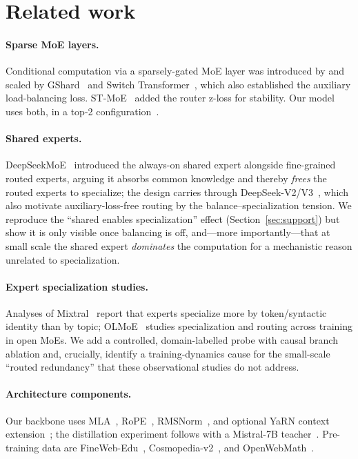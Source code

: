 \documentclass[11pt]{article}
\begin{document}
\section{Related work}

\paragraph{Sparse MoE layers.} Conditional computation via a sparsely-gated MoE layer was
introduced by \citet{shazeer2017outrageously} and scaled by GShard~\citep{lepikhin2021gshard} and
Switch Transformer~\citep{fedus2022switch}, which also established the auxiliary load-balancing
loss. ST-MoE~\citep{zoph2022stmoe} added the router z-loss for stability. Our model uses both, in a
top-2 configuration~\citep{jiang2024mixtral}.

\paragraph{Shared experts.} DeepSeekMoE~\citep{dai2024deepseekmoe} introduced the always-on shared
expert alongside fine-grained routed experts, arguing it absorbs common knowledge and thereby
\emph{frees} the routed experts to specialize; the design carries through
DeepSeek-V2/V3~\citep{deepseekv2,deepseekv3}, which also motivate auxiliary-loss-free routing by the
balance--specialization tension. We reproduce the ``shared enables specialization'' effect
(Section~\ref{sec:support}) but show it is only visible once balancing is off, and---more
importantly---that at small scale the shared expert \emph{dominates} the computation for a
mechanistic reason unrelated to specialization.

\paragraph{Expert specialization studies.} Analyses of Mixtral~\citep{jiang2024mixtral} report that
experts specialize more by token/syntactic identity than by topic; OLMoE~\citep{muennighoff2024olmoe}
studies specialization and routing across training in open MoEs. We add a controlled,
domain-labelled probe with causal branch ablation and, crucially, identify a training-dynamics cause
for the small-scale ``routed redundancy'' that these observational studies do not address.

\paragraph{Architecture components.} Our backbone uses MLA~\citep{deepseekv2}, RoPE~\citep{su2021roformer},
RMSNorm~\citep{zhang2019rmsnorm}, and optional YaRN context extension~\citep{peng2023yarn}; the
distillation experiment follows \citet{hinton2015distilling} with a Mistral-7B
teacher~\citep{jiang2023mistral}. Pre-training data are FineWeb-Edu~\citep{penedo2024fineweb},
Cosmopedia-v2~\citep{benallal2024cosmopedia}, and OpenWebMath~\citep{paster2023openwebmath}.
\end{document}
